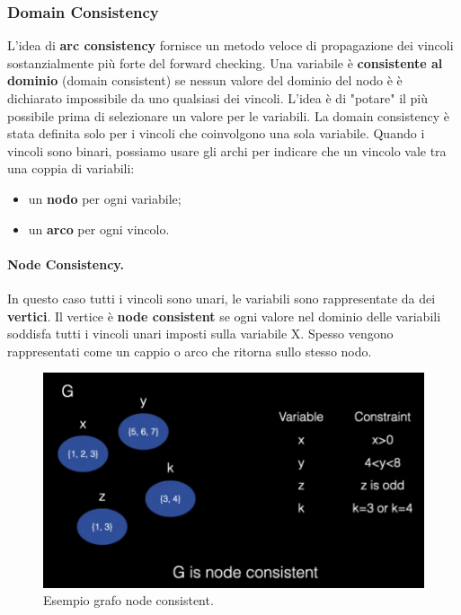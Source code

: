 \subsubsection{Domain Consistency} L'idea di \textbf{arc consistency} fornisce un metodo veloce di propagazione dei vincoli sostanzialmente più forte del forward checking.
Una variabile è \textbf{consistente al dominio} (domain consistent) se nessun valore del dominio del nodo è è dichiarato impossibile da uno qualsiasi dei vincoli. L'idea è di "potare" il più possibile prima di selezionare un valore per le variabili. La domain consistency è stata definita solo per i vincoli che coinvolgono una sola variabile. Quando i vincoli sono binari, possiamo usare gli archi per indicare che un vincolo vale tra una coppia di variabili:
\begin{itemize}
    \item un \textbf{nodo} per ogni variabile;
    \item un \textbf{arco} per ogni vincolo.
\end{itemize}

\paragraph{Node Consistency.} In questo caso tutti i vincoli sono unari, le variabili sono rappresentate da dei \textbf{vertici}. Il vertice è \textbf{node consistent} se ogni valore nel dominio delle variabili soddisfa tutti i vincoli unari imposti sulla variabile X. Spesso vengono rappresentati come un cappio o arco che ritorna sullo stesso nodo. 
\begin{figure}[H]
    \centering
    \includegraphics[width=13cm, keepaspectratio]{img/node_consistency.png}
    \caption{Esempio grafo node consistent.}\label{fig:node_consistency}
\end{figure}

